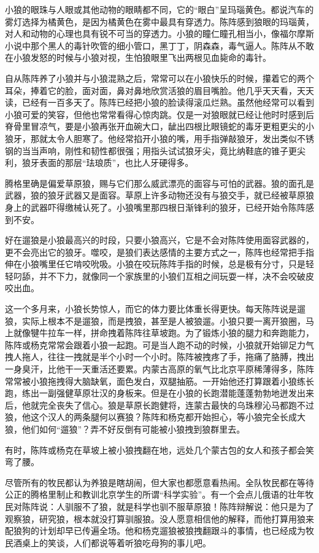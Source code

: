 \par 小狼的眼珠与人眼或其他动物的眼睛都不同，它的“眼白”呈玛瑙黄色。都说汽车的雾灯选择为橘黄色，是因为橘黄色在雾中最具有穿透力。陈阵感到狼眼的玛瑙黄，对人和动物的心理也具有锐不可当的穿透力。小狼的瞳仁瞳孔相当小，像福尔摩斯小说中那个黑人的毒针吹管的细小管口，黑丁丁，阴森森，毒气逼人。陈阵从不敢在小狼发怒的时候与小狼对视，生怕狼眼里飞出两根见血毙命的毒针。
\par 自从陈阵养了小狼并与小狼混熟之后，常常可以在小狼快乐的时候，攥着它的两个耳朵，捧着它的脸，面对面，鼻对鼻地欣赏活狼的眉目嘴脸。他几乎天天看，天天读，已经有一百多天了。陈阵已经把小狼的脸读得滚瓜烂熟。虽然他经常可以看到小狼可爱的笑容，但他也常常看得心惊肉跳。仅是一对狼眼就已经让他时时感到后脊骨里冒凉气，要是小狼再张开血碗大口，龇出四根比眼镜蛇的毒牙更粗更尖的小狼牙，那就太令人胆寒了。他经常掐开小狼的嘴，用手指弹敲狼牙，发出类似不锈钢的当当声响，刚性和韧性都很强；用指头试试狼牙尖，竟比纳鞋底的锥子更尖利，狼牙表面的那层“珐琅质”，也比人牙硬得多。
\par 腾格里确是偏爱草原狼，赐与它们那么威武漂亮的面容与可怕的武器。狼的面孔是武器，狼的狼牙武器又是面容。草原上许多动物还没有与狼交手，就已经被草原狼身上的武器吓得缴械认死了。小狼嘴里那四根日渐锋利的狼牙，已经开始令陈阵感到不安。
\par 好在遛狼是小狼最高兴的时段，只要小狼高兴，它是不会对陈阵使用面容武器的，更不会亮出它的狼牙。噬咬，是狼们表达感情的主要方式之一，陈阵也经常把手指伸在小狼嘴里任它啃咬吮吸。小狼在咬玩陈阵手指的时候，总是极有分寸，只是轻轻叼舔，并不下力，就像同一个家族里的小狼们互相之间玩耍一样，决不会咬破皮咬出血。
\par 这一个多月来，小狼长势惊人，而它的体力要比体重长得更快。每天陈阵说是遛狼，实际上根本不是遛狼，而是拽狼，甚至是人被狼遛。小狼只要一离开狼圈，马上就像犍牛拉车一样，拼命拽着陈阵往草坡跑。为了锻炼小狼的腿力和奔跑能力，陈阵或杨克常常会跟着小狼一起跑。可是当人跑不动的时候，小狼就开始铆足力气拽人拖人，往往一拽就是半个小时一个小时。陈阵被拽疼了手，拖痛了胳膊，拽出一身臭汗，比他干一天重活还要累。内蒙古高原的氧气比北京平原稀薄得多，陈阵常常被小狼拖拽得大脑缺氧，面色发白，双腿抽筋。一开始他还打算跟着小狼练长跑，练出一副强健草原壮汉的身板来。但是在小狼的长跑潜能蓬蓬勃勃地迸发出来后，他就完全丧失了信心。狼是草原长跑健将，连蒙古最快的乌珠穆沁马都跑不过狼，他这个汉人的两条腿何以赛狼？陈阵和杨克都开始担心，等小狼完全长成大狼，他们如何“遛狼”？弄不好反倒有可能被小狼拽到狼群里去。
\par 有时，陈阵或杨克在草坡上被小狼拽翻在地，远处几个蒙古包的女人和孩子都会笑弯了腰。
\par 尽管所有的牧民都认为养狼是瞎胡闹，但大家也都愿意看热闹。全队牧民都在等待公正的腾格里制止和教训北京学生的所谓“科学实验”。有一个会点儿俄语的壮年牧民对陈阵说：人驯服不了狼，就是科学也驯不服草原狼！陈阵辩解说：他只是为了观察狼，研究狼，根本就没打算驯服狼。没人愿意相信他的解释，而他打算用狼来配狼狗的计划却早已传遍全场。他和杨克遛狼被狼拽翻跟斗的事情，也已经成为牧民酒桌上的笑谈，人们都说等着听狼吃母狗的事儿吧。
